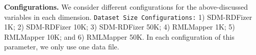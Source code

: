 \noindent \textbf{Configurations.}
We consider different configurations for the above-discussed variables in each dimension. 
%
\texttt{Dataset Size Configurations:} 1) SDM-RDFizer 1K; 2) SDM-RDFizer 10K; 3) SDM-RDFizer 50K; 4) RMLMapper 1K; 5) RML\-Mapper 10K; and 6) RMLMapper 50K. In each configuration of this parameter, we only use one data file.
%
\begin{figure}[!t]
    \centering
    \qquad
\end{figure}
